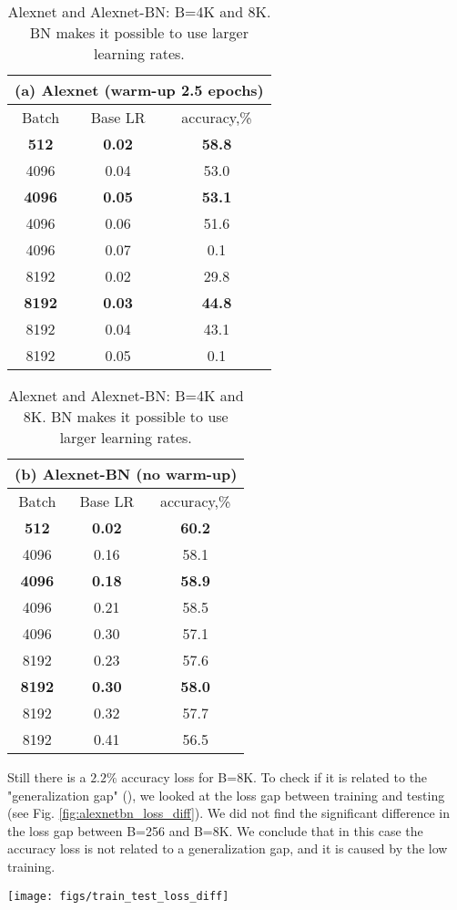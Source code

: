 \documentclass{article} %
\begin{document}
\begin{table}[htb!]
  \caption{Alexnet and Alexnet-BN: B=4K and 8K. BN makes it possible to use larger learning rates.}
  \label{tab:alexnet}
  \centering
  {\renewcommand{\arraystretch}{1.2}
  \begin{tabular}[t]{|c|c|c|}
  \multicolumn{3}{c}{(a) Alexnet (warm-up 2.5 epochs)} \\
  \hline 
  Batch & Base LR & accuracy,\% \\
  \hline
  {\bf 512 } & {\bf 0.02}  &  {\bf 58.8} \\
  \hline
  4096 & 0.04 &  53.0 \\
  {\bf 4096} &  {\bf 0.05} & {\bf 53.1} \\
  4096 & 0.06 & 51.6\\
  4096 & 0.07 & 0.1\\
  \hline
  8192 & 0.02 & 29.8 \\
  {\bf 8192} & {\bf 0.03} & {\bf 44.8}\\
  8192 & 0.04 & 43.1 \\
  8192 & 0.05 & 0.1  \\
  \hline
  \end{tabular}}
  \quad
  {\renewcommand{\arraystretch}{1.2}
  \begin{tabular}[t]{|c|c|c|}
  \multicolumn{3}{c}{(b) Alexnet-BN (no warm-up)} \\
  \hline 
  Batch & Base LR  & accuracy,\% \\
  \hline
  {\bf 512} &  {\bf 0.02} & {\bf 60.2}\\
  \hline
  4096 & 0.16 & 58.1 \\
  {\bf 4096} & {\bf 0.18}  & {\bf 58.9}\\
  4096 & 0.21  & 58.5\\
  4096 & 0.30  & 57.1\\
  \hline
  8192 & 0.23 & 57.6 \\
  {\bf 8192} &  {\bf 0.30} & {\bf 58.0} \\
  8192 & 0.32 &  57.7 \\
  8192 & 0.41 &  56.5\\
  \hline 
  \end{tabular}}
\end{table}
Still there is  a $2.2\%$ accuracy loss for B=8K. To check if it is related to the "generalization gap" (\cite{keskar2016large}), we looked at the loss gap between training and testing (see Fig. \ref{fig:alexnetbn_loss_diff}). We did not find the significant difference in the loss gap between B=256 and B=8K. We conclude that in this case the accuracy loss is not related to a generalization gap, and it is caused by the low training.
\begin{figure*}[htb!]
\centering
\texttt{[image: figs/train\_test\_loss\_diff]}
\caption{Alexnet-BN: Gap between training and testing loss}
\label{fig:alexnetbn_loss_diff}
\vspace{-10pt}
\end{figure*}
\end{document}
